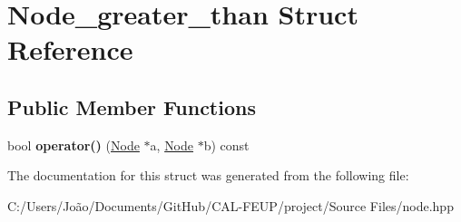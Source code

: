 \hypertarget{struct_node__greater__than}{}\section{Node\+\_\+greater\+\_\+than Struct Reference}
\label{struct_node__greater__than}
\subsection*{Public Member Functions}
\begin{DoxyCompactItemize}
\item 
\mbox{\label{struct_node__greater__than_a97e69e2984481dc2586a512b41c4dfa4}} 
bool {\bfseries operator()} (\hyperlink{class_node}{Node} $\ast$a, \hyperlink{class_node}{Node} $\ast$b) const
\end{DoxyCompactItemize}


The documentation for this struct was generated from the following file\+:\begin{DoxyCompactItemize}
\item 
C\+:/\+Users/\+João/\+Documents/\+Git\+Hub/\+C\+A\+L-\/\+F\+E\+U\+P/project/\+Source Files/node.\+hpp\end{DoxyCompactItemize}
